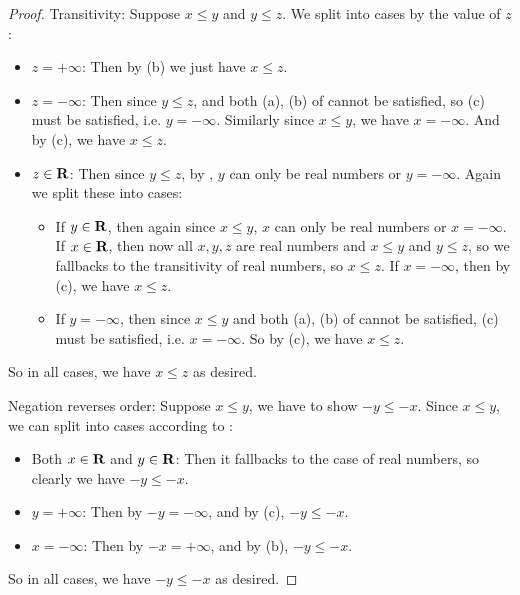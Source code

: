 \begin{proof}
Transitivity: Suppose \(x \le y\) and \(y \le z\).
We split into cases by the value of \(z\):
\begin{itemize}
\item \(z = +\infty\):
    Then by (b) we just have \(x \le z\).
\item \(z = -\infty\):
    Then since \(y \le z\), and both (a), (b) of  cannot be satisfied, so (c) must be satisfied, i.e. \(y = -\infty\).
    Similarly since \(x \le y\), we have \(x = -\infty\).
    And by (c), we have \(x \le z\).
\item \(z \in \mathbf{R}\):
    Then since \(y \le z\), by , \(y\) can only be real numbers or \(y = -\infty\). Again we split these into cases:
    \begin{itemize}
        \item
            If \(y \in \mathbf{R}\), then again since \(x \le y\), \(x\) can only be real numbers or \(x = -\infty\).
            If \(x \in \mathbf{R}\), then now all \(x, y, z\) are real numbers and \(x \le y\) and \(y \le z\), so we fallbacks to the transitivity of real numbers, so \(x \le z\).
            If \(x = -\infty\), then by (c), we have \(x \le z\).
        \item
            If \(y = -\infty\), then since \(x \le y\) and both (a), (b) of  cannot be satisfied, (c) must be satisfied, i.e. \(x = -\infty\).
            So by (c), we have \(x \le z\).
    \end{itemize}
\end{itemize}
So in all cases, we have \(x \le z\) as desired.

Negation reverses order: Suppose \(x \le y\), we have to show \(-y \le -x\).
Since \(x \le y\), we can split into cases according to :
\begin{itemize}
    \item Both \(x \in \mathbf{R}\) and \(y \in \mathbf{R}\):
        Then it fallbacks to the case of real numbers, so clearly we have \(-y \le -x\).
    \item \(y = +\infty\):
        Then by  \(-y = -\infty\), and by (c), \(-y \le -x\).
    \item \(x = -\infty\):
        Then by  \(-x = +\infty\), and by (b), \(-y \le -x\).
\end{itemize}
So in all cases, we have \(-y \le -x\) as desired.
\end{proof}

